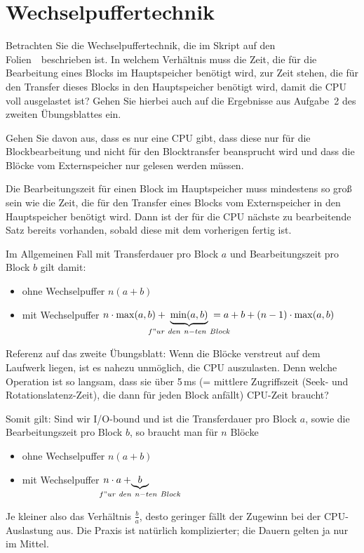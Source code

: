 \section{Wechselpuffertechnik}
Betrachten Sie die Wechselpuffertechnik, die im Skript auf den Folien~\Wechselpuffertechnik~beschrieben ist. In welchem Verhältnis muss die Zeit, die für die Bearbeitung eines Blocks im Hauptspeicher benötigt wird, zur Zeit stehen, die für den Transfer dieses Blocks in den Hauptspeicher benötigt wird, damit die CPU voll ausgelastet ist? Gehen Sie hierbei auch auf die Ergebnisse aus Aufgabe~2 des zweiten Übungsblattes ein.

Gehen Sie davon aus, dass es nur eine CPU gibt, dass diese nur für die Blockbearbeitung und nicht für den Blocktransfer beansprucht wird und dass die Blöcke vom Externspeicher nur gelesen werden müssen.

\begin{solution}
Die Bearbeitungszeit für einen Block im Hauptspeicher muss mindestens so groß sein wie die Zeit, die für den Transfer eines Blocks vom Externspeicher in den Hauptspeicher benötigt wird.
Dann ist der für die CPU nächste zu bearbeitende Satz bereits vorhanden, sobald diese mit dem vorherigen fertig ist.

Im Allgemeinen Fall mit Transferdauer pro Block $a$ und Bearbeitungszeit pro Block $b$ gilt damit:
\begin{itemize}
	\item ohne Wechselpuffer $n(a+b)$
	\item mit Wechselpuffer $n \cdot \max(a, b)+\hspace{-20pt}\underbrace{\min(a, b)}_{f"ur~den~n-ten~Block}\hspace{-20pt} = a + b + (n-1) \cdot \max(a,b)$
\end{itemize}

Referenz auf das zweite Übungsblatt:
Wenn die Blöcke verstreut auf dem Laufwerk liegen, ist es nahezu unmöglich, die CPU auszulasten. Denn welche Operation ist so langsam, dass sie über 5\,ms (= mittlere Zugriffszeit (Seek- und Rotationslatenz-Zeit), die dann für jeden Block anfällt) CPU-Zeit braucht?

Somit gilt: Sind wir I/O-bound und ist die Transferdauer pro Block $a$, sowie die Bearbeitungszeit pro Block $b$, so braucht man für $n$ Blöcke
\begin{itemize}
	\item ohne Wechselpuffer $n(a+b)$
	\item mit Wechselpuffer $n \cdot a+\hspace{-35pt}\underbrace{b}_{f"ur~den~n-ten~Block}$
\end{itemize}

Je kleiner also das Verhältnis $\frac{b}{a}$, desto geringer fällt der Zugewinn bei der CPU-Auslastung aus. Die Praxis ist natürlich komplizierter; die Dauern gelten ja nur im Mittel.





\end{solution}

